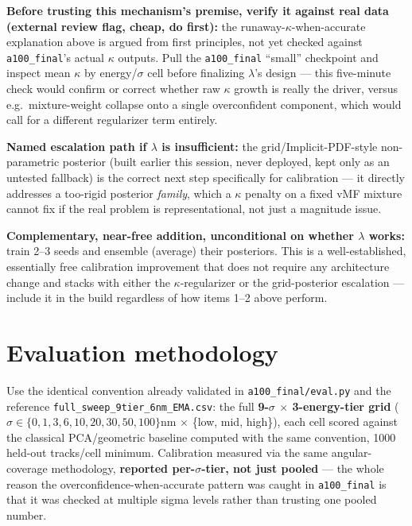 \documentclass[11pt]{article}
\newcommand{\code}[1]{\texttt{#1}}
\begin{document}
\textbf{Before trusting this mechanism's premise, verify it against real data (external
review flag, cheap, do first):} the runaway-$\kappa$-when-accurate explanation above is
argued from first principles, not yet checked against \code{a100\_final}'s actual $\kappa$
outputs. Pull the \code{a100\_final} ``small'' checkpoint and inspect mean $\kappa$ by
energy/$\sigma$ cell before finalizing $\lambda$'s design --- this five-minute check would
confirm or correct whether raw $\kappa$ growth is really the driver, versus e.g.\
mixture-weight collapse onto a single overconfident component, which would call for a
different regularizer term entirely.

\textbf{Named escalation path if $\lambda$ is insufficient:} the grid/Implicit-PDF-style
non-parametric posterior (built earlier this session, never deployed, kept only as an
untested fallback) is the correct next step specifically for calibration --- it directly
addresses a too-rigid posterior \emph{family}, which a $\kappa$ penalty on a fixed vMF
mixture cannot fix if the real problem is representational, not just a magnitude issue.

\textbf{Complementary, near-free addition, unconditional on whether $\lambda$ works:} train
2--3 seeds and ensemble (average) their posteriors. This is a well-established, essentially
free calibration improvement that does not require any architecture change and stacks with
either the $\kappa$-regularizer or the grid-posterior escalation --- include it in the build
regardless of how items 1--2 above perform.

\section{Evaluation methodology}
\label{sec:eval}

Use the identical convention already validated in \code{a100\_final/eval.py} and the
reference \code{full\_sweep\_9tier\_6nm\_EMA.csv}: the full \textbf{9-$\sigma$
$\times$ 3-energy-tier grid} ($\sigma\in\{0,1,3,6,10,20,30,50,100\}$nm $\times$
\{low, mid, high\}), each cell scored against the classical PCA/geometric baseline computed
with the same convention, 1000 held-out tracks/cell minimum. Calibration measured via the
same angular-coverage methodology, \textbf{reported per-$\sigma$-tier, not just pooled} ---
the whole reason the overconfidence-when-accurate pattern was caught in \code{a100\_final}
is that it was checked at multiple sigma levels rather than trusting one pooled number.
\end{document}
